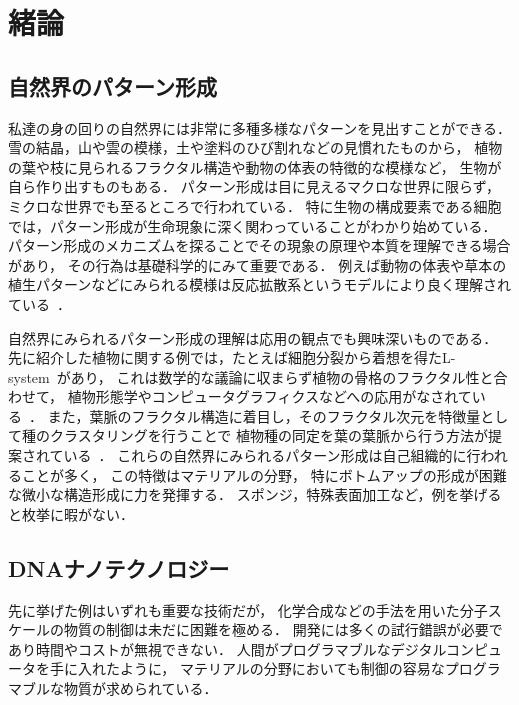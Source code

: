 \chapter{緒論}

\section{自然界のパターン形成}
私達の身の回りの自然界には非常に多種多様なパターンを見出すことができる．
雪の結晶，山や雲の模様，土や塗料のひび割れなどの見慣れたものから，
植物の葉や枝に見られるフラクタル構造や動物の体表の特徴的な模様など，
生物が自ら作り出すものもある．
パターン形成は目に見えるマクロな世界に限らず，
ミクロな世界でも至るところで行われている．
特に生物の構成要素である細胞では，パターン形成が生命現象に深く関わっていることがわかり始めている．
パターン形成のメカニズムを探ることでその現象の原理や本質を理解できる場合があり，
その行為は基礎科学的にみて重要である．
例えば動物の体表や草本の植生パターンなどにみられる模様は反応拡散系というモデルにより良く理解されている~\cite{turing1990chemical}．

自然界にみられるパターン形成の理解は応用の観点でも興味深いものである．
先に紹介した植物に関する例では，たとえば細胞分裂から着想を得たL-system~\cite{lindenmayer1968mathematical}があり，
これは数学的な議論に収まらず植物の骨格のフラクタル性と合わせて，
植物形態学やコンピュータグラフィクスなどへの応用がなされている~\cite{aono1984botanical}．
また，葉脈のフラクタル構造に着目し，そのフラクタル次元を特徴量として種のクラスタリングを行うことで
植物種の同定を葉の葉脈から行う方法が提案されている~\cite{bruno2008fractal}．
これらの自然界にみられるパターン形成は自己組織的に行われることが多く，
この特徴はマテリアルの分野，
特にボトムアップの形成が困難な微小な構造形成に力を発揮する．
スポンジ，特殊表面加工など，例を挙げると枚挙に暇がない．
%


\section{DNAナノテクノロジー}
先に挙げた例はいずれも重要な技術だが，
化学合成などの手法を用いた分子スケールの物質の制御は未だに困難を極める．
開発には多くの試行錯誤が必要であり時間やコストが無視できない．
人間がプログラマブルなデジタルコンピュータを手に入れたように，
マテリアルの分野においても制御の容易なプログラマブルな物質が求められている．

